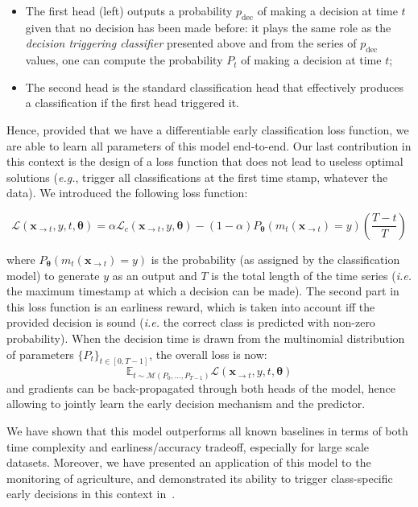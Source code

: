 \begin{itemize}
\item The first head (left) outputs a probability $p_\text{dec}$ of making a
decision at
time $t$ given that no decision has been made before: it plays the same role
as the \emph{decision triggering classifier} presented above and from the series of
$p_\text{dec}$ values, one can compute the probability $P_t$ of making a
decision at time $t$;
\item The second head is the standard classification head that effectively produces
a classification if the first head triggered it.
\end{itemize}

Hence, provided that we have a differentiable early classification loss
function, we are able to learn all parameters of this model end-to-end.
Our last contribution in this context is the design of a loss function that
does not lead to useless optimal solutions (\emph{e.g.}, trigger all
classifications at
the first time stamp, whatever the data).
We introduced the following loss function:

\begin{equation}
    \mathcal{L}(\mathbf{x}_{\rightarrow t}, y, t, \boldsymbol{\theta}) =
        \alpha \mathcal{L}_c(\mathbf{x}_{\rightarrow t}, y, \boldsymbol{\theta})
            - (1-\alpha) P_{\boldsymbol{\theta}}(m_t(\mathbf{x}_{\rightarrow t})=y)
            \left( \frac{T-t}{T} \right)
\end{equation}

\noindent
where $P_{\boldsymbol{\theta}}(m_t(\mathbf{x}_{\rightarrow t})=y)$ is the
probability (as
assigned by the classification model) to generate $y$ as an output and $T$ is
the total length of the time series (\emph{i.e.} the maximum timestamp at which
a decision can be made).
The second part in this loss function is an earliness reward, which is taken
into account iff the provided decision is sound (\emph{i.e.} the correct class
is
predicted with non-zero probability).
When the decision time is drawn from the
multinomial distribution of parameters $\{P_t\}_{t \in [0, T-1]}$, the overall
loss is now:
\begin{equation}
    \mathbb{E}_{t \sim \mathcal{M}(P_0, \dots , P_{T-1})}
        \mathcal{L}(\mathbf{x}_{\rightarrow t}, y, t, \boldsymbol{\theta})
\end{equation}
and gradients can be back-propagated through both heads of the model, hence
allowing to jointly learn the early decision mechanism and the predictor.

We have shown that this model outperforms all known baselines in terms of both
time complexity and earliness/accuracy tradeoff, especially for large scale
datasets.
Moreover, we have presented an application of this model to the monitoring of
agriculture, and demonstrated its ability to trigger class-specific early
decisions in this context in~\cite{ruwurm:hal-02343851}.
